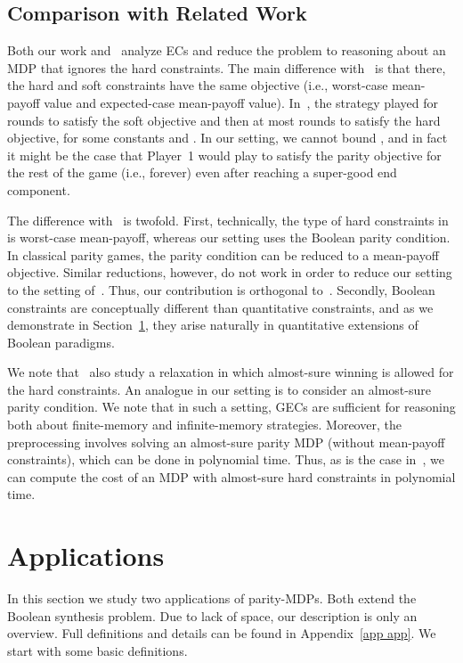 \documentclass[runningheads,a4paper]{llncs}
\newcommand{\gecs}{{GECs}\xspace}
\begin{document}
\subsection{Comparison with Related Work}
\label{subsec:overview_discussion}
Both our work and~\cite{BFRR14a,CR15} analyze ECs and reduce the problem to reasoning about an MDP that ignores the hard constraints.
The main difference with~\cite{BFRR14a} is that there, the hard and soft constraints have the same objective (i.e., worst-case mean-payoff value and expected-case mean-payoff value).
In~\cite{BFRR14a}, the strategy played for  rounds to satisfy the soft objective and then at most  rounds to satisfy the hard objective, for some constants  and .
In our setting, we cannot bound , and in fact it might be the case that Player~1 would play to satisfy the parity objective for the rest of the game (i.e., forever) even after reaching a super-good end component.

The difference with~\cite{CR15} is twofold. First, technically, the type of hard constraints in~\cite{CR15} is worst-case mean-payoff, whereas our setting uses the Boolean parity condition. In classical parity games, the parity condition can be reduced to a mean-payoff objective. Similar reductions, however, do not work in order to reduce our setting to the setting of~\cite{CR15}. Thus, our contribution is orthogonal to~\cite{CR15}. Secondly, Boolean constraints are conceptually different than quantitative constraints, and as we demonstrate in Section~\ref{sec:applications}, they arise naturally in quantitative extensions of Boolean paradigms.

We note that~\cite{CR15} also study a relaxation in which  almost-sure winning is allowed for the hard constraints. An analogue in our setting is to consider an almost-sure parity condition. We note that in such a setting, \gecs are sufficient for reasoning both about finite-memory and infinite-memory strategies. 
Moreover, the preprocessing involves solving an almost-sure parity MDP (without mean-payoff constraints), which can be done in polynomial time.
Thus, as is the case in~\cite{CR15}, we can compute the cost of an MDP with almost-sure hard constraints in polynomial time.




\section{Applications}
\label{sec:applications}

In this section we study two applications of parity-MDPs. Both extend the Boolean synthesis problem. 
Due to lack of space, our description is only an overview. Full definitions and details can be found in Appendix~\ref{app app}.
We start with some basic definitions.
\end{document}
